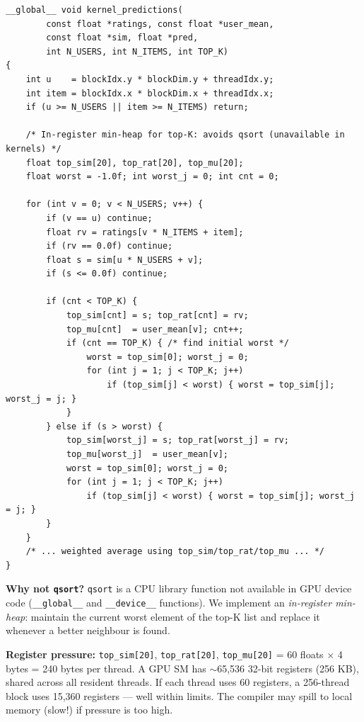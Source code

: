 \documentclass[12pt,a4paper]{article}
\begin{document}
\begin{lstlisting}
__global__ void kernel_predictions(
        const float *ratings, const float *user_mean,
        const float *sim, float *pred,
        int N_USERS, int N_ITEMS, int TOP_K)
{
    int u    = blockIdx.y * blockDim.y + threadIdx.y;
    int item = blockIdx.x * blockDim.x + threadIdx.x;
    if (u >= N_USERS || item >= N_ITEMS) return;

    /* In-register min-heap for top-K: avoids qsort (unavailable in kernels) */
    float top_sim[20], top_rat[20], top_mu[20];
    float worst = -1.0f; int worst_j = 0; int cnt = 0;

    for (int v = 0; v < N_USERS; v++) {
        if (v == u) continue;
        float rv = ratings[v * N_ITEMS + item];
        if (rv == 0.0f) continue;
        float s = sim[u * N_USERS + v];
        if (s <= 0.0f) continue;

        if (cnt < TOP_K) {
            top_sim[cnt] = s; top_rat[cnt] = rv;
            top_mu[cnt]  = user_mean[v]; cnt++;
            if (cnt == TOP_K) { /* find initial worst */
                worst = top_sim[0]; worst_j = 0;
                for (int j = 1; j < TOP_K; j++)
                    if (top_sim[j] < worst) { worst = top_sim[j]; worst_j = j; }
            }
        } else if (s > worst) {
            top_sim[worst_j] = s; top_rat[worst_j] = rv;
            top_mu[worst_j]  = user_mean[v];
            worst = top_sim[0]; worst_j = 0;
            for (int j = 1; j < TOP_K; j++)
                if (top_sim[j] < worst) { worst = top_sim[j]; worst_j = j; }
        }
    }
    /* ... weighted average using top_sim/top_rat/top_mu ... */
}
\end{lstlisting}

\textbf{Why not \texttt{qsort}?}  \texttt{qsort} is a CPU library function
not available in GPU device code (\texttt{\_\_global\_\_} and
\texttt{\_\_device\_\_} functions).  We implement an \emph{in-register
min-heap}: maintain the current worst element of the top-K list and replace
it whenever a better neighbour is found.

\textbf{Register pressure:}  \texttt{top\_sim[20]}, \texttt{top\_rat[20]},
\texttt{top\_mu[20]} = 60 floats $\times$ 4 bytes = 240 bytes per thread.  A
GPU SM has $\sim$65,536 32-bit registers (256 KB), shared across all resident
threads.  If each thread uses 60 registers, a 256-thread block uses 15,360
registers — well within limits.  The compiler may spill to local memory
(slow!) if pressure is too high.

\end{document}
